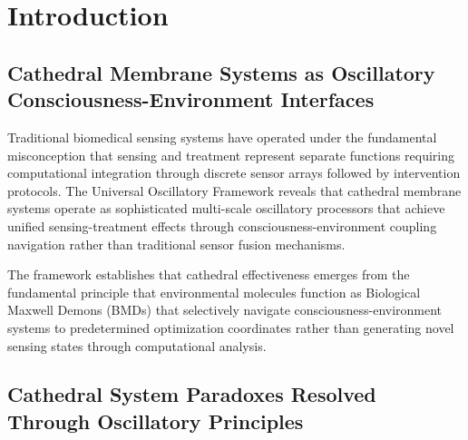 \documentclass[12pt,a4paper]{article}
\begin{document}
\begin{abstract}
Integration with gas molecular information dynamics reveals that cathedral systems process information through thermodynamic equilibrium states rather than computational analysis, achieving logarithmic complexity $O(\log S_0)$ versus traditional exponential complexity $O(e^n)$ through direct navigation to predetermined solution manifolds enhanced by resource-aware optimization, adversarial robustness, and temporal evidence decay weighting.

\textbf{Keywords:} Universal Oscillatory Framework, cathedral membrane systems, environmental BMD processing, consciousness-environment coupling, oscillatory biomedical interfaces, quantum fluid dynamics
\end{abstract}

\section{Introduction}

\subsection{Cathedral Membrane Systems as Oscillatory Consciousness-Environment Interfaces}

Traditional biomedical sensing systems have operated under the fundamental misconception that sensing and treatment represent separate functions requiring computational integration through discrete sensor arrays followed by intervention protocols. The Universal Oscillatory Framework \cite{sachikonye2024mathematical,sachikonye2024physical} reveals that cathedral membrane systems operate as sophisticated multi-scale oscillatory processors that achieve unified sensing-treatment effects through consciousness-environment coupling navigation rather than traditional sensor fusion mechanisms.

The framework establishes that cathedral effectiveness emerges from the fundamental principle that environmental molecules function as Biological Maxwell Demons (BMDs) that selectively navigate consciousness-environment systems to predetermined optimization coordinates rather than generating novel sensing states through computational analysis.

\subsection{Cathedral System Paradoxes Resolved Through Oscillatory Principles}
\end{document}
